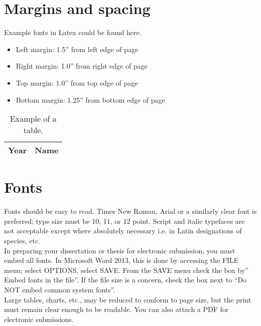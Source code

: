 \section{Margins and spacing}
Example fonts in Latex could be found here\cite{latex-font}.\\

\begin{itemize}
    \item Left margin: 1.5” from left edge of page
    \item Right margin: 1.0” from right edge of page
    \item Top margin: 1.0” from top edge of page
    \item Bottom margin: 1.25” from bottom edge of page 
\end{itemize}

\begin{table}[]
\centering
\caption{Example of a table.}
\label{tab:complexitylocal}
\begin{tabular}{|l|l|}
\hline
\textbf{Year} & \textbf{Name} \\ \hline
\end{tabular}
\end{table}

\section{Fonts}
Fonts should be easy to read. Times New Roman, Arial or a similarly clear font is preferred; type size must be 10, 11, or 12 point. Script and italic typefaces are not acceptable except where absolutely necessary i.e. in Latin designations of species, etc. \\
In preparing your dissertation or thesis for electronic submission, you must embed all fonts. In Microsoft Word 2013, this is done by accessing the FILE menu; select OPTIONS, select SAVE. From the SAVE menu check the box by” Embed fonts in the file”. If the file size is a concern, check the box next to “Do NOT embed common system fonts”. \\
Large tables, charts, etc., may be reduced to conform to page size, but the print must remain clear enough to be readable. You can also attach a PDF for electronic submissions.

